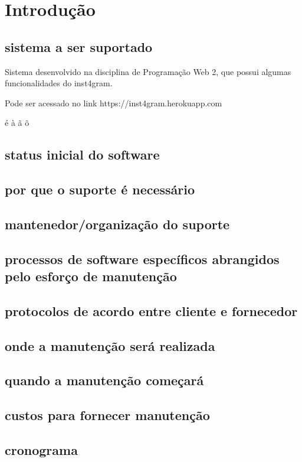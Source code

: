 \chapter{Introdução} 

\section{sistema a ser suportado}

Sistema desenvolvido na disciplina de Programação Web 2, que possui algumas funcionalidades do inst4gram.

Pode ser acessado no link https://inst4gram.herokuapp.com

é à ã õ

\section{status inicial do software} 

\section{por que o suporte é necessário} 

\section{mantenedor/organização do suporte} 

\section{processos de software específicos abrangidos pelo esforço de manutenção} 

\section{protocolos de acordo entre cliente e fornecedor}

\section{onde a manutenção será realizada}

\section{quando a manutenção começará}

\section{custos para fornecer manutenção}

\section{cronograma}
